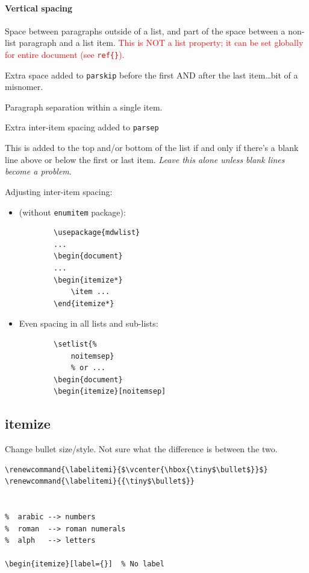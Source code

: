 \documentclass{article}
\renewcommand{\labelitemi}{$\vcenter{\hbox{\tiny$\bullet$}}$}
\begin{document}
\paragraph{Vertical spacing}
\begin{description}[labelindent=2cm, leftmargin=\labelindent]
    \item [parskip] Space between paragraphs outside of a list, and part of
        the space between a non-list paragraph and a list item.
        \textcolor{red}{This is NOT a list property; it can be set
        globally for entire document (see \SS{} \texttt{ref\{\}}).}
    \item [topsep] Extra space added to \texttt{parskip} before the first
        AND after the last item\ldots bit of a misnomer.
    \item [parsep] Paragraph separation within a single item.
    \item [itemsep] Extra inter-item spacing added to \texttt{parsep}
    \item [partopsep] This is added to the top and/or bottom of the list
        if and only if there's a blank line above or below the first
        or last item. \emph{Leave this alone unless blank lines become a
        problem}.
\end{description}
Adjusting inter-item spacing:
\begin{itemize}
    \item (without \texttt{enumitem} package):
        \begin{lstlisting}
        \usepackage{mdwlist}
        ...
        \begin{document}
        ...
        \begin{itemize*}
            \item ...
        \end{itemize*}
        \end{lstlisting}
    \item Even spacing in all lists and sub-lists:
        \begin{lstlisting}
        \setlist{%
            noitemsep}
            % or ...
        \begin{document}
        \begin{itemize}[noitemsep]
        \end{lstlisting}
\end{itemize}

\subsection{itemize}
Change bullet size/style. Not sure what the difference is between the two.
\begin{lstlisting}
\renewcommand{\labelitemi}{$\vcenter{\hbox{\tiny$\bullet$}}$}
\renewcommand{\labelitemi}{{\tiny$\bullet$}}


%  arabic --> numbers
%  roman  --> roman numerals
%  alph   --> letters

\begin{itemize}[label={}]  % No label
\end{lstlisting}
\end{document}
